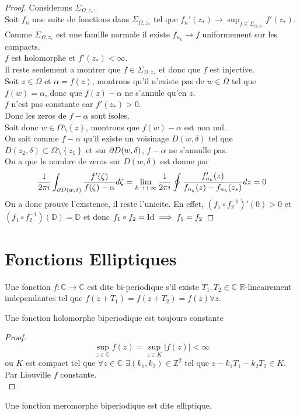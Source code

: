 \documentclass[../main.tex]{subfiles}
\begin{document}
\begin{proof}
Considerons $\Sigma_{\Omega,z_*} $.\\
Soit $f_n$ une suite de fonctions dans $\Sigma_{\Omega,z_*} $ tel que $f_n'( z_*) \to \sup_{f\in \Sigma_{\Omega,z_*} } f'( z_*) $.\\
Comme $\Sigma_{\Omega,z_*} $ est une famille normale il existe $f_{n_k} \to f$ uniformement sur les compacts.\\
$f$ est holomorphe et $f'( z_*) < \infty $.\\
Il reste seulement a montrer que $f\in \Sigma_{\Omega,z_*} $ et donc que $f$ est injective.\\
Soit $z\in \Omega$ et $\alpha= f( z) $, montrons qu'il n'existe pas de $w\in\Omega$ tel que $f( w) =\alpha$, donc que $f( z) -\alpha$ ne s'annule qu'en $z$.\\
$f$ n'est pas constante car $f'( z_*) >0$.\\
Donc les zeros de $f-\alpha$ sont isoles.\\
Soit donc $w\in \Omega\setminus \left\{ z \right\} $, montrons que $f( w) -\alpha$ est non nul.\\
On sait comme $f-\alpha$ qu'il existe un voisinage $D( w,\delta) $ tel que $D( z_2,\delta) \subset \Omega\setminus \left\{ z_1 \right\} $  et sur $\partial D( w,\delta) $, $f-\alpha$ ne s'annulle pas.\\
On a que le nombre de zeros sur $D( w,\delta) $  est donne par
\[ 
\frac{1}{2\pi i}\int_{\partial D( w,\delta) } \frac{f'( \zeta) }{f( \zeta)-\alpha }d\zeta= \lim_{k \to  + \infty} \frac{1}{2\pi i} \oint \frac{f'_{n_k} ( z) }{f_{n_k}( z) -f_{n_k} ( z_*)  } dz =0
\]
On a donc prouve l'existence, il reste l'unicite.
En effet, $( f_1\circ f_2^{-1} )'( 0) >0$ et $( f_1\circ f_2^{-1}) ( \mathbb{D}) = \mathbb{D}$ et donc $f_1\circ f_2= \operatorname{Id}\implies f_1= f_2$ 
\end{proof}
\section{Fonctions Elliptiques}
Une fonction $f: \mathbb{C}\to \mathbb{C}$ est dite bi-periodique s'il existe $T_1,T_2\in \mathbb{C}$ $ \mathbb{R}$-lineairement independantes tel que $f( z + T_1) = f( z+ T_2) = f( z) \forall z$.\\
\begin{propo}
Une fonction holomorphe biperiodique est toujours constante
\end{propo}
\begin{proof}
\[ 
\sup_{z\in \mathbb{C}} f( z) = \sup_{z\in K} |f( z) | < \infty 
\]
ou $K$ est compact tel que $\forall z \in \mathbb{C}$ $\exists ( k_1,k_2) \in \mathbb{Z}^{2}$ tel que $z-k_1T_1- k_2T_2\in K	$.\\
Par Liouville $f$ constante.\\

\end{proof}
\begin{defn}
	Une fonction meromorphe biperiodique est dite elliptique.	
\end{defn}
		
	
\end{document}
